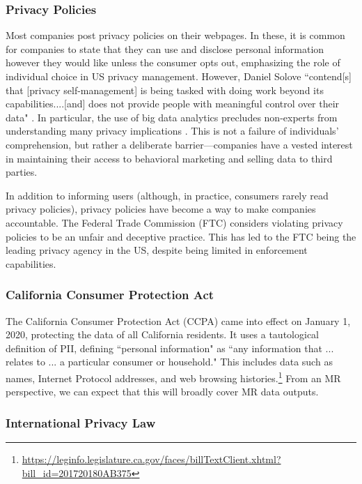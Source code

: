 \subsubsection{Privacy Policies}

Most companies post privacy policies on their webpages. In these, it is common for companies to state that they can use and disclose personal information however they would like unless the consumer opts out, emphasizing the role of individual choice in US privacy management. However, Daniel Solove ``contend[s] that [privacy self-management] is being tasked with doing work beyond its capabilities....[and] does not provide people with meaningful control over their data" \cite{solove2012introduction}. In particular, the use of big data analytics precludes non-experts from understanding many privacy implications \cite{baruh2017big}. This is not a failure of individuals' comprehension, but rather a deliberate barrier---companies have a vested interest in maintaining their access to behavioral marketing and selling data to third parties.

In addition to informing users (although, in practice, consumers rarely read privacy policies), privacy policies have become a way to make companies accountable. The Federal Trade Commission (FTC) considers violating privacy policies to be an unfair and deceptive practice. This has led to the FTC being the leading privacy agency in the US, despite being limited in enforcement capabilities.

\subsubsection{California Consumer Protection Act}
The California Consumer Protection Act (CCPA) came into effect on January 1, 2020, protecting the data of all California residents. It uses a tautological definition of PII, defining ``personal information" as ``any information that ... relates to ... a particular consumer or household." This includes data such as names, Internet Protocol addresses, and web browsing histories.\footnote{\url{https://leginfo.legislature.ca.gov/faces/billTextClient.xhtml?bill_id=201720180AB375}}
 From an MR perspective, we can expect that this will broadly cover MR data outputs.

\subsubsection{International Privacy Law}

